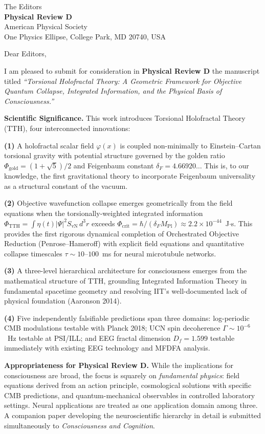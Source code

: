 \documentclass[12pt,a4paper]{letter}
\begin{document}
\begin{letter}{The Editors\\
\textbf{Physical Review D}\\
American Physical Society\\
One Physics Ellipse, College Park, MD 20740, USA}

\opening{Dear Editors,}

I am pleased to submit for consideration in \textbf{Physical Review D}
the manuscript titled \textit{``Torsional Holofractal Theory:
A Geometric Framework for Objective Quantum Collapse, Integrated Information,
and the Physical Basis of Consciousness.''}

\textbf{Scientific Significance.}
This work introduces Torsional Holofractal Theory (TTH), four interconnected innovations:

\textbf{(1)} A holofractal scalar field $\varphi(x)$ is coupled non-minimally to
Einstein--Cartan torsional gravity with potential structure governed by the golden ratio
$\Phi_{\mathrm{gold}} = (1+\sqrt5)/2$ and Feigenbaum constant $\delta_F = 4.66920\ldots$
This is, to our knowledge, the first gravitational theory to incorporate Feigenbaum universality
as a structural constant of the vacuum.

\textbf{(2)} Objective wavefunction collapse emerges geometrically from the field equations
when the torsionally-weighted integrated information
$\Phi_{\mathrm{TTH}} = \int\eta(t)|\Psi|^2 S_{\mathrm{vN}}\,d^3r$ exceeds
$\Phi_{\mathrm{crit}} = \hbar/(\delta_F M_{\mathrm{Pl}}) \approx 2.2\times10^{-44}$~J$\cdot$s.
This provides the first rigorous dynamical completion of Orchestrated Objective Reduction
(Penrose--Hameroff) with explicit field equations and quantitative collapse timescales
$\tau \sim 10$--$100$~ms for neural microtubule networks.

\textbf{(3)} A three-level hierarchical architecture for consciousness emerges from
the mathematical structure of TTH, grounding Integrated Information Theory in
fundamental spacetime geometry and resolving IIT's well-documented lack of physical
foundation (Aaronson 2014).

\textbf{(4)} Five independently falsifiable predictions span three domains:
log-periodic CMB modulations testable with Planck 2018;
UCN spin decoherence $\Gamma \sim 10^{-6}$~Hz testable at PSI/ILL;
and EEG fractal dimension $D_f = 1.599$ testable immediately
with existing EEG technology and MFDFA analysis.

\textbf{Appropriateness for Physical Review D.}
While the implications for consciousness are broad, the focus is squarely on
\textit{fundamental physics}: field equations derived from an action principle,
cosmological solutions with specific CMB predictions, and quantum-mechanical
observables in controlled laboratory settings.
Neural applications are treated as one application domain among three.
A companion paper developing the neuroscientific hierarchy in detail is submitted
simultaneously to \textit{Consciousness and Cognition}.


\end{letter}
\end{document}
